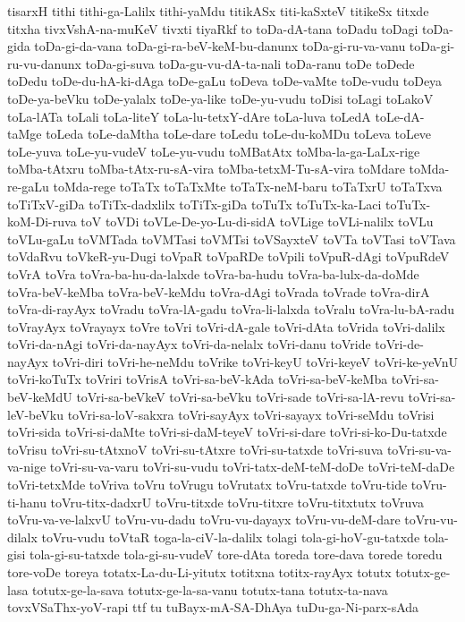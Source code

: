 {tisarxH
tithi
tithi-ga-Lalilx
tithi-yaMdu
titikASx
titi-kaSxteV
titikeSx
titxde
titxha
tivxVshA-na-muKeV
tivxti
tiyaRkf
to
toDa-dA-tana
toDadu
toDagi
toDa-gida
toDa-gi-da-vana
toDa-gi-ra-beV-keM-bu-danunx
toDa-gi-ru-va-vanu
toDa-gi-ru-vu-danunx
toDa-gi-suva
toDa-gu-vu-dA-ta-nali
toDa-ranu
toDe
toDede
toDedu
toDe-du-hA-ki-dAga
toDe-gaLu
toDeva
toDe-vaMte
toDe-vudu
toDeya
toDe-ya-beVku
toDe-yalalx
toDe-ya-like
toDe-yu-vudu
toDisi
toLagi
toLakoV
toLa-lATa
toLali
toLa-liteY
toLa-lu-tetxY-dAre
toLa-luva
toLedA
toLe-dA-taMge
toLeda
toLe-daMtha
toLe-dare
toLedu
toLe-du-koMDu
toLeva
toLeve
toLe-yuva
toLe-yu-vudeV
toLe-yu-vudu
toMBatAtx
toMba-la-ga-LaLx-rige
toMba-tAtxru
toMba-tAtx-ru-sA-vira
toMba-tetxM-Tu-sA-vira
toMdare
toMda-re-gaLu
toMda-rege
toTaTx
toTaTxMte
toTaTx-neM-baru
toTaTxrU
toTaTxva
toTiTxV-giDa
toTiTx-dadxlilx
toTiTx-giDa
toTuTx
toTuTx-ka-Laci
toTuTx-koM-Di-ruva
toV
toVDi
toVLe-De-yo-Lu-di-sidA
toVLige
toVLi-nalilx
toVLu
toVLu-gaLu
toVMTada
toVMTasi
toVMTsi
toVSayxteV
toVTa
toVTasi
toVTava
toVdaRvu
toVkeR-yu-Dugi
toVpaR
toVpaRDe
toVpili
toVpuR-dAgi
toVpuRdeV
toVrA
toVra
toVra-ba-hu-da-lalxde
toVra-ba-hudu
toVra-ba-lulx-da-doMde
toVra-beV-keMba
toVra-beV-keMdu
toVra-dAgi
toVrada
toVrade
toVra-dirA
toVra-di-rayAyx
toVradu
toVra-lA-gadu
toVra-li-lalxda
toVralu
toVra-lu-bA-radu
toVrayAyx
toVrayayx
toVre
toVri
toVri-dA-gale
toVri-dAta
toVrida
toVri-dalilx
toVri-da-nAgi
toVri-da-nayAyx
toVri-da-nelalx
toVri-danu
toVride
toVri-de-nayAyx
toVri-diri
toVri-he-neMdu
toVrike
toVri-keyU
toVri-keyeV
toVri-ke-yeVnU
toVri-koTuTx
toVriri
toVrisA
toVri-sa-beV-kAda
toVri-sa-beV-keMba
toVri-sa-beV-keMdU
toVri-sa-beVkeV
toVri-sa-beVku
toVri-sade
toVri-sa-lA-revu
toVri-sa-leV-beVku
toVri-sa-loV-sakxra
toVri-sayAyx
toVri-sayayx
toVri-seMdu
toVrisi
toVri-sida
toVri-si-daMte
toVri-si-daM-teyeV
toVri-si-dare
toVri-si-ko-Du-tatxde
toVrisu
toVri-su-tAtxnoV
toVri-su-tAtxre
toVri-su-tatxde
toVri-suva
toVri-su-va-va-nige
toVri-su-va-varu
toVri-su-vudu
toVri-tatx-deM-teM-doDe
toVri-teM-daDe
toVri-tetxMde
toVriva
toVru
toVrugu
toVrutatx
toVru-tatxde
toVru-tide
toVru-ti-hanu
toVru-titx-dadxrU
toVru-titxde
toVru-titxre
toVru-titxtutx
toVruva
toVru-va-ve-lalxvU
toVru-vu-dadu
toVru-vu-dayayx
toVru-vu-deM-dare
toVru-vu-dilalx
toVru-vudu
toVtaR
toga-la-ciV-la-dalilx
tolagi
tola-gi-hoV-gu-tatxde
tola-gisi
tola-gi-su-tatxde
tola-gi-su-vudeV
tore-dAta
toreda
tore-dava
torede
toredu
tore-voDe
toreya
totatx-La-du-Li-yitutx
totitxna
totitx-rayAyx
totutx
totutx-ge-lasa
totutx-ge-la-sava
totutx-ge-la-sa-vanu
totutx-tana
totutx-ta-nava
tovxVSaThx-yoV-rapi
ttf
tu
tuBayx-mA-SA-DhAya
tuDu-ga-Ni-parx-sAda
}
